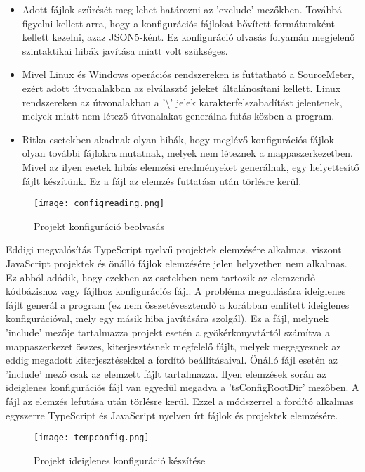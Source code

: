 \begin{itemize}
    \item Adott fájlok szűrését meg lehet határozni az 'exclude' mezőkben. Továbbá figyelni kellett arra, hogy a konfigurációs fájlokat bővített formátumként kellett kezelni, azaz JSON5-ként. Ez konfiguráció olvasás folyamán megjelenő szintaktikai hibák javítása miatt volt szükséges.
    \item Mivel Linux és Windows operációs rendszereken is futtatható a SourceMeter, ezért adott útvonalakban az elválasztó jeleket általánosítani kellett. Linux rendszereken az útvonalakban a '\textbackslash' jelek karakterfelszabadítást jelentenek, melyek miatt nem létező útvonalakat generálna futás közben a program.
    \item Ritka esetekben akadnak olyan hibák, hogy meglévő konfigurációs fájlok olyan további fájlokra mutatnak, melyek nem léteznek a mappaszerkezetben. Mivel az ilyen esetek hibás elemzési eredményeket generálnak, egy helyettesítő fájlt készítünk. Ez a fájl az elemzés futtatása után törlésre kerül.
\end{itemize} 

\begin{figure}[!htbp]
    \caption{Projekt konfiguráció beolvasás}\label{fig:projconfig}
    \centering
    \texttt{[image: configreading.png]}
\end{figure}

\noindent

Eddigi megvalósítás TypeScript nyelvű projektek elemzésére alkalmas, viszont JavaScript projektek és önálló fájlok elemzésére jelen helyzetben nem alkalmas. Ez abból adódik, hogy ezekben az esetekben nem tartozik az elemzendő kódbázishoz vagy fájlhoz konfigurációs fájl. A probléma megoldására ideiglenes fájlt generál a program (ez nem összetévesztendő a korábban említett ideiglenes konfigurációval, mely egy másik hiba javítására szolgál). Ez a fájl, melynek 'include' mezője tartalmazza projekt esetén a gyökérkonyvtártól számítva a mappaszerkezet összes, kiterjesztésnek megfelelő fájlt, melyek megegyeznek az eddig megadott kiterjesztésekkel a fordító beállításaival. Önálló fájl esetén az 'include' mező csak az elemzett fájlt tartalmazza.
Ilyen elemzések során az ideiglenes konfigurációs fájl van egyedül megadva a 'tsConfigRootDir' mezőben. A fájl az elemzés lefutása után törlésre kerül.
Ezzel a módszerrel a fordító alkalmas egyszerre TypeScript és JavaScript nyelven írt fájlok és projektek elemzésére. 

\begin{figure}[!htbp]
    \caption{Projekt ideiglenes konfiguráció készítése}\label{fig:projtempconfig}
    \centering
    \texttt{[image: tempconfig.png]}
\end{figure}

